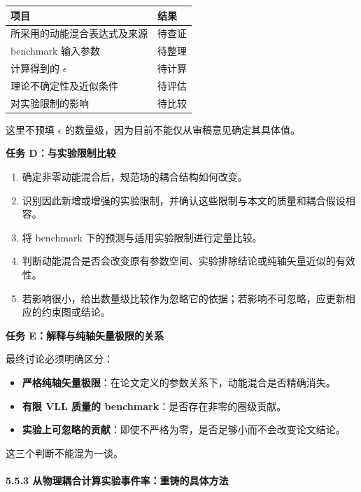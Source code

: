 \documentclass[
  chinese,
  UTF8]{ctexart}
\newcounter{none} %
\providecommand{\tightlist}{%
  \setlength{\itemsep}{0pt}\setlength{\parskip}{0pt}}
\begin{document}
{\def\LTcaptype{none} %
\begin{longtable}[]{@{}ll@{}}
\toprule\noalign{}
项目 & 结果 \\
\midrule\noalign{}
\endhead
\bottomrule\noalign{}
\endlastfoot
所采用的动能混合表达式及来源 & 待查证 \\
benchmark 输入参数 & 待整理 \\
计算得到的 \(\epsilon\) & 待计算 \\
理论不确定性及近似条件 & 待评估 \\
对实验限制的影响 & 待比较 \\
\end{longtable}
}

这里不预填 \(\epsilon\) 的数量级，因为目前不能仅从审稿意见确定其具体值。

\textbf{任务 D：与实验限制比较}

\begin{enumerate}
\def\labelenumi{\arabic{enumi}.}
\tightlist
\item
  确定非零动能混合后，规范场的耦合结构如何改变。
\item
  识别因此新增或增强的实验限制，并确认这些限制与本文的质量和耦合假设相容。
\item
  将 benchmark 下的预测与适用实验限制进行定量比较。
\item
  判断动能混合是否会改变原有参数空间、实验排除结论或纯轴矢量近似的有效性。
\item
  若影响很小，给出数量级比较作为忽略它的依据；若影响不可忽略，应更新相应的约束图或结论。
\end{enumerate}

\textbf{任务 E：解释与纯轴矢量极限的关系}

最终讨论必须明确区分：

\begin{itemize}
\tightlist
\item
  \textbf{严格纯轴矢量极限}：在论文定义的参数关系下，动能混合是否精确消失。
\item
  \textbf{有限 VLL 质量的 benchmark}：是否存在非零的圈级贡献。
\item
  \textbf{实验上可忽略的贡献}：即使不严格为零，是否足够小而不会改变论文结论。
\end{itemize}

这三个判断不能混为一谈。

\paragraph{5.5.3
从物理耦合计算实验事件率：重铸的具体方法}\label{ux4eceux7269ux7406ux8026ux5408ux8ba1ux7b97ux5b9eux9a8cux4e8bux4ef6ux7387ux91cdux94f8ux7684ux5177ux4f53ux65b9ux6cd5}
\end{document}

